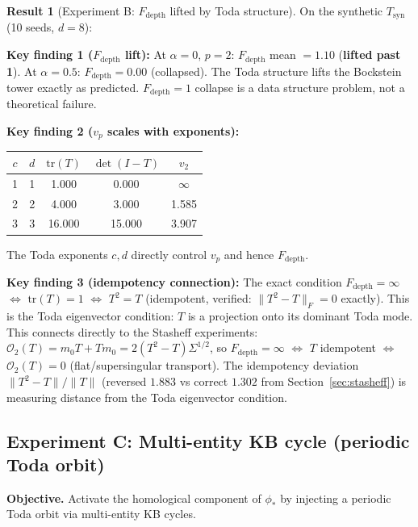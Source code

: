 \documentclass[11pt]{amsart}
\theoremstyle{definition}
\newtheorem{result}[theorem]{Result}
\begin{document}
\begin{result}[Experiment B: $F_\mathrm{depth}$ lifted by Toda structure]
\label{result:exp-B}
On the synthetic $T_{\mathrm{syn}}$ (10 seeds, $d=8$):

\noindent\textbf{Key finding 1 ($F_\mathrm{depth}$ lift):}
At $\alpha=0$, $p=2$: $F_\mathrm{depth}$ mean $= 1.10$ (\textbf{lifted past 1}).
At $\alpha = 0.5$: $F_\mathrm{depth} = 0.00$ (collapsed).
The Toda structure lifts the Bockstein tower exactly as predicted.
$F_\mathrm{depth} = 1$ collapse is a data structure problem,
not a theoretical failure.

\noindent\textbf{Key finding 2 ($v_p$ scales with exponents):}
\begin{center}
\begin{tabular}{@{}ccccc@{}}
\toprule
$c$ & $d$ & $\mathrm{tr}(T)$ & $\det(I-T)$ & $v_2$ \\
\midrule
1 & 1 & 1.000 & 0.000 & $\infty$ \\
2 & 2 & 4.000 & 3.000 & 1.585 \\
3 & 3 & 16.000 & 15.000 & 3.907 \\
\bottomrule
\end{tabular}
\end{center}
The Toda exponents $c, d$ directly control $v_p$ and hence $F_\mathrm{depth}$.

\noindent\textbf{Key finding 3 (idempotency connection):}
The exact condition $F_\mathrm{depth} = \infty$
$\iff$ $\mathrm{tr}(T) = 1$
$\iff$ $T^2 = T$ (idempotent, verified: $\|T^2 - T\|_F = 0$ exactly).
This is the Toda eigenvector condition: $T$ is a projection
onto its dominant Toda mode.
This connects directly to the Stasheff experiments:
$\mathcal{O}_2(T) = m_0 T + T m_0 = 2(T^2-T)\Sigma^{1/2}$,
so $F_\mathrm{depth} = \infty$ $\iff$ $T$ idempotent $\iff$ $\mathcal{O}_2(T) = 0$
(flat/supersingular transport).
The idempotency deviation $\|T^2-T\|/\|T\|$ (reversed $1.883$ vs correct
$1.302$ from Section~\ref{sec:stasheff}) is measuring distance from
the Toda eigenvector condition.
\end{result}

\subsection{Experiment C: Multi-entity KB cycle (periodic Toda orbit)}

\textbf{Objective.}
Activate the homological component of $\phi_*$ by injecting a
periodic Toda orbit via multi-entity KB cycles.
\end{document}
